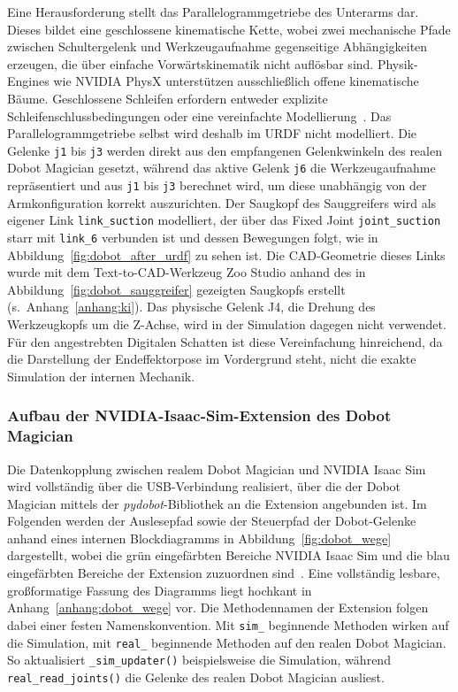 Eine Herausforderung stellt das Parallelogrammgetriebe des Unterarms dar.
Dieses bildet eine geschlossene kinematische Kette, wobei zwei mechanische Pfade zwischen Schultergelenk und Werkzeugaufnahme gegenseitige Abhängigkeiten erzeugen, die über einfache Vorwärtskinematik nicht auflösbar sind.
Physik-Engines wie NVIDIA PhysX unterstützen ausschließlich offene kinematische Bäume. Geschlossene Schleifen erfordern entweder explizite Schleifenschlussbedingungen oder eine vereinfachte Modellierung~\cite{nvidia_physx}.
Das Parallelogrammgetriebe selbst wird deshalb im URDF nicht modelliert.
Die Gelenke \texttt{j1} bis \texttt{j3} werden direkt aus den empfangenen Gelenkwinkeln des realen Dobot Magician gesetzt, während das aktive Gelenk \texttt{j6} die Werkzeugaufnahme repräsentiert und aus \texttt{j1} bis \texttt{j3} berechnet wird, um diese unabhängig von der Armkonfiguration korrekt auszurichten.
Der Saugkopf des Sauggreifers wird als eigener Link \texttt{link\_suction} modelliert, der über das Fixed Joint \texttt{joint\_suction} starr mit \texttt{link\_6} verbunden ist und dessen Bewegungen folgt, wie in Abbildung~\ref{fig:dobot_after_urdf} zu sehen ist.
Die CAD-Geometrie dieses Links wurde mit dem Text-to-CAD-Werkzeug Zoo Studio anhand des in Abbildung~\ref{fig:dobot_sauggreifer} gezeigten Saugkopfs erstellt (s.\ Anhang~\ref{anhang:ki}).
Das physische Gelenk J4, die Drehung des Werkzeugkopfs um die Z-Achse, wird in der Simulation dagegen nicht verwendet.
Für den angestrebten Digitalen Schatten ist diese Vereinfachung hinreichend, da die Darstellung der Endeffektorpose im Vordergrund steht, nicht die exakte Simulation der internen Mechanik.

\subsubsection{Aufbau der NVIDIA-Isaac-Sim-Extension des Dobot Magician}
Die Datenkopplung zwischen realem Dobot Magician und NVIDIA Isaac Sim wird vollständig über die USB-Verbindung realisiert, über die der Dobot Magician mittels der \emph{pydobot}-Bibliothek an die Extension angebunden ist.
Im Folgenden werden der Auslesepfad sowie der Steuerpfad der Dobot-Gelenke anhand eines internen Blockdiagramms in Abbildung~\ref{fig:dobot_wege} dargestellt, wobei die grün eingefärbten Bereiche NVIDIA Isaac Sim und die blau eingefärbten Bereiche der Extension zuzuordnen sind~\cite{nvidia_isaacsim_robot_setup_tutorials}. Eine vollständig lesbare, großformatige Fassung des Diagramms liegt hochkant in Anhang~\ref{anhang:dobot_wege} vor.
Die Methodennamen der Extension folgen dabei einer festen Namenskonvention. Mit \texttt{sim\_} beginnende Methoden wirken auf die Simulation, mit \texttt{real\_} beginnende Methoden auf den realen Dobot Magician. So aktualisiert \texttt{\_sim\_updater()} beispielsweise die Simulation, während \texttt{real\_read\_joints()} die Gelenke des realen Dobot Magician ausliest.

